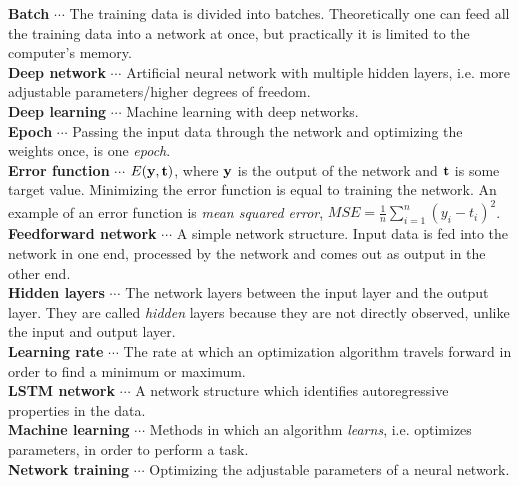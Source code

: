 \documentclass[12pt, letterpaper]{amsart}%
\begin{document}
\noindent
\textbf{Batch} $\cdots$ The training data is divided into batches. Theoretically one can feed all the training data into a network at once, but practically it is limited to the computer's memory.
\\

\noindent
\textbf{Deep network} $\cdots$ Artificial neural network with multiple hidden layers, i.e. more adjustable parameters/higher degrees of freedom.
\\

\noindent
\textbf{Deep learning} $\cdots$ Machine learning with deep networks.
\\

\noindent
\textbf{Epoch} $\cdots$ Passing the input data through the network and optimizing the weights once, is one \textit{epoch}.
\\

\noindent
\textbf{Error function} $\cdots$ $E(\bold{y},\bold{t})$, where $\bold{y}$ is the output of the network and $\bold{t}$ is some target value. Minimizing the error function is equal to training the network. An example of an error function is \textit{mean squared error}, $MSE = \frac{1}{n} \sum_{i=1}^n (y_i - t_i)^2$.
\\

\noindent
\textbf{Feedforward network} $\cdots$ A simple network structure. Input data is fed into the network in one end, processed by the network and comes out as output in the other end.
\\

\noindent
\textbf{Hidden layers} $\cdots$ The network layers between the input layer and the output layer. They are called \textit{hidden} layers because they are not directly observed, unlike the input and output layer.
\\

\noindent
\textbf{Learning rate} $\cdots$ The rate at which an optimization algorithm travels forward in order to find a minimum or maximum.
\\

\noindent
\textbf{LSTM network} $\cdots$ A network structure which identifies autoregressive properties in the data.
\\

\noindent
\textbf{Machine learning} $\cdots$ Methods in which an algorithm \textit{learns}, i.e. optimizes parameters, in order to perform a task. 
\\

\noindent
\textbf{Network training} $\cdots$ Optimizing the adjustable parameters of a neural network. 
\\
\end{document}
